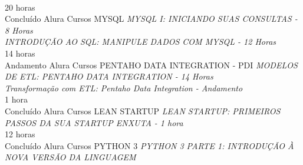 \documentclass[]{friggeri-cv}
\begin{document}
\begin{entrylist}
    \\
    \entry
    {20 horas \\Concluído}
    {Alura Cursos}
    {MYSQL}
    {\emph{
    MYSQL I: INICIANDO SUAS CONSULTAS - 8 Horas \\
    INTRODUÇÃO AO SQL: MANIPULE DADOS COM MYSQL - 12 Horas}}
    \\
    \entry
    {14 horas \\Andamento}
    {Alura Cursos}
    {PENTAHO DATA INTEGRATION - PDI}
    {\emph{
    MODELOS DE ETL: PENTAHO DATA INTEGRATION - 14 Horas \\
    Transformação com ETL: Pentaho Data Integration - Andamento}}
    \\
    \entry
    {1 hora \\Concluído}
    {Alura Cursos}
    {LEAN STARTUP}
    {\emph{
    LEAN STARTUP: PRIMEIROS PASSOS DA SUA STARTUP ENXUTA - 1 hora}}
    \\
    \entry
    {12 horas \\Concluído}
    {Alura Cursos}
    {PYTHON 3}
    {\emph{
    PYTHON 3 PARTE 1: INTRODUÇÃO À NOVA VERSÃO DA LINGUAGEM}}
    \\

\end{entrylist}
\end{document}
